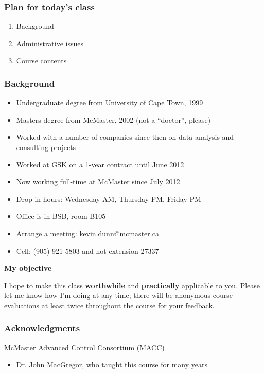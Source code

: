 \begin{frame}\frametitle{Plan for today's class}
	\begin{enumerate}
		\item	Background 
		\item	Administrative issues 
		\item	Course contents 
	\end{enumerate}
\end{frame}

\begin{frame}\frametitle{Background}
	{\color{myGreen}{About myself}}
	\begin{itemize}
		\item	Undergraduate degree from University of Cape Town, 1999
		\item	Masters degree from McMaster, 2002 (not a ``doctor'', please)
		\item	Worked with a number of companies since then on data analysis and consulting projects
		\item	Worked at GSK on a 1-year contract until June 2012
		\item	Now working full-time at McMaster since July 2012
		\item	Drop-in hours: Wednesday AM, Thursday PM, Friday PM
		\item	Office is in BSB, room B105
		\item	Arrange a meeting: \url{kevin.dunn@mcmaster.ca}
		\item	Cell: (905) 921 5803 and not \sout{extension 27337}
	\end{itemize}
	
	\vspace{12pt}
	\textbf{My objective}
	
	\vspace{6pt}
	I hope to make this class \textbf{worthwhile} and \textbf{practically} applicable to you. Please let me know how I'm doing at any time; there will be anonymous course evaluations at least twice throughout the course for your feedback.
\end{frame}

\begin{frame}\frametitle{Acknowledgments}
	
	McMaster Advanced Control Consortium (MACC) 
	\begin{itemize}
		\item	Dr. John MacGregor, who taught this course for many years 
	\end{itemize}
\end{frame}

